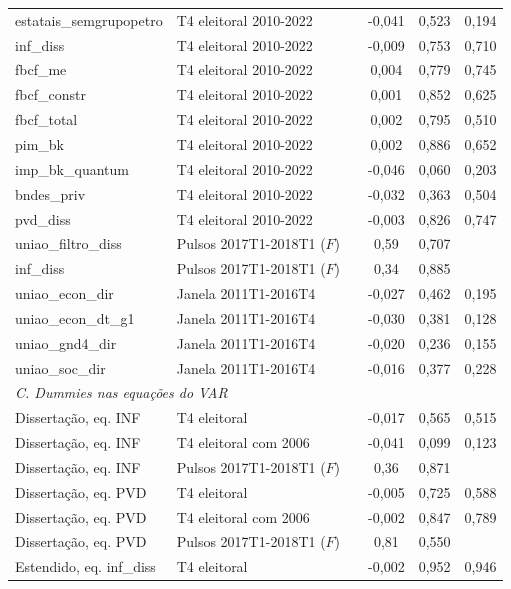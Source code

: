 \begin{table}[htbp]
\begin{tabular}{lllccc}
estatais\_semgrupopetro & T4 eleitoral 2010-2022 & & -0{,}041 & 0{,}523 & 0{,}194 \\
inf\_diss & T4 eleitoral 2010-2022 & & -0{,}009 & 0{,}753 & 0{,}710 \\
fbcf\_me & T4 eleitoral 2010-2022 & & 0{,}004 & 0{,}779 & 0{,}745 \\
fbcf\_constr & T4 eleitoral 2010-2022 & & 0{,}001 & 0{,}852 & 0{,}625 \\
fbcf\_total & T4 eleitoral 2010-2022 & & 0{,}002 & 0{,}795 & 0{,}510 \\
pim\_bk & T4 eleitoral 2010-2022 & & 0{,}002 & 0{,}886 & 0{,}652 \\
imp\_bk\_quantum & T4 eleitoral 2010-2022 & & -0{,}046 & 0{,}060 & 0{,}203 \\
bndes\_priv & T4 eleitoral 2010-2022 & & -0{,}032 & 0{,}363 & 0{,}504 \\
pvd\_diss & T4 eleitoral 2010-2022 & & -0{,}003 & 0{,}826 & 0{,}747 \\
uniao\_filtro\_diss & Pulsos 2017T1-2018T1 ($F$) & & 0{,}59 & 0{,}707 &  \\
inf\_diss & Pulsos 2017T1-2018T1 ($F$) & & 0{,}34 & 0{,}885 &  \\
uniao\_econ\_dir & Janela 2011T1-2016T4 & & -0{,}027 & 0{,}462 & 0{,}195 \\
uniao\_econ\_dt\_g1 & Janela 2011T1-2016T4 & & -0{,}030 & 0{,}381 & 0{,}128 \\
uniao\_gnd4\_dir & Janela 2011T1-2016T4 & & -0{,}020 & 0{,}236 & 0{,}155 \\
uniao\_soc\_dir & Janela 2011T1-2016T4 & & -0{,}016 & 0{,}377 & 0{,}228 \\
\midrule
\multicolumn{6}{l}{\textit{C. Dummies nas equa\c{c}\~oes do VAR}} \\
Disserta\c{c}\~ao, eq. INF & T4 eleitoral & & -0{,}017 & 0{,}565 & 0{,}515 \\
Disserta\c{c}\~ao, eq. INF & T4 eleitoral com 2006 & & -0{,}041 & 0{,}099 & 0{,}123 \\
Disserta\c{c}\~ao, eq. INF & Pulsos 2017T1-2018T1 ($F$) & & 0{,}36 & 0{,}871 &  \\
Disserta\c{c}\~ao, eq. PVD & T4 eleitoral & & -0{,}005 & 0{,}725 & 0{,}588 \\
Disserta\c{c}\~ao, eq. PVD & T4 eleitoral com 2006 & & -0{,}002 & 0{,}847 & 0{,}789 \\
Disserta\c{c}\~ao, eq. PVD & Pulsos 2017T1-2018T1 ($F$) & & 0{,}81 & 0{,}550 &  \\
Estendido, eq. inf\_diss & T4 eleitoral & & -0{,}002 & 0{,}952 & 0{,}946 \\

\end{tabular}
\end{table}
